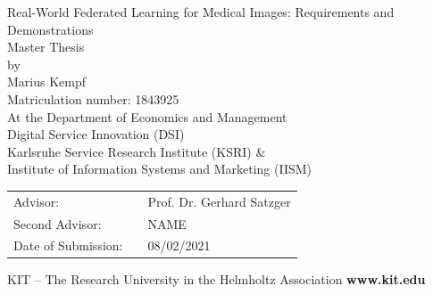 \begin{titlepage}
\vspace*{0.5cm}
\begin{center}
		\Huge{Real-World Federated Learning for Medical Images: Requirements and Demonstrations}
		\vspace*{1.0cm}\\
		\Large{Master Thesis}\\
		\Large{by}\\
		\vspace*{0.8cm}
		\huge{Marius Kempf}\\
		\large{Matriculation number: 1843925}\\
		\vspace*{1cm}
		\Large{
			At the Department of Economics and Management
			\\ \vspace*{1cm}
			Digital Service Innovation (DSI)
			\\ \vspace*{0.5cm}
			Karlsruhe Service Research Institute (KSRI) \& \\
			Institute of Information Systems and Marketing (IISM)
		}
	\end{center}
	\vspace*{0.75cm}
\Large{
\begin{center}
\begin{tabular}[ht]{l c l}
  Advisor: & \hfill  &Prof. Dr. Gerhard Satzger\\
  Second Advisor: & \hfill  &NAME\\ 
  Date of Submission:  & \hfill  &08/02/2021\\
\end{tabular}
\end{center}
}


\vspace*{1.0cm}
	\tiny{KIT -- The Research University in the Helmholtz Association} \hfill \small{\textbf{www.kit.edu} }
\end{titlepage}
